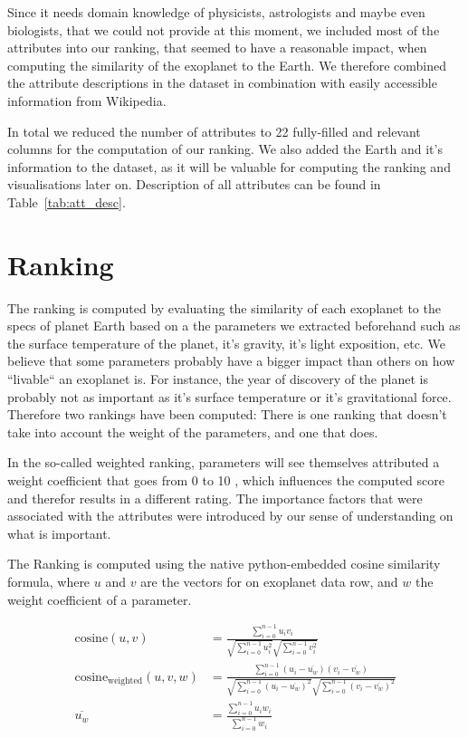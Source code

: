 \documentclass[12p]{article}
\begin{document}
Since it needs domain knowledge of physicists, astrologists and maybe even biologists, that we could not provide at this moment, we included most of the attributes into our ranking, that seemed to have a reasonable impact, when computing the similarity of the exoplanet to the Earth. We therefore combined the attribute descriptions in the dataset in combination with easily accessible information from Wikipedia.

In total we reduced the number of attributes to 22 fully-filled and relevant columns for the computation of our ranking. We also added the Earth and it's information to the dataset, as it will be valuable for computing the ranking and visualisations later on. Description of all attributes can be found in Table~\ref{tab:att_desc}.


\section{Ranking}
The ranking is computed by evaluating the similarity of each exoplanet to the specs of planet Earth based on a the parameters we extracted beforehand such as the surface temperature of the planet, it’s gravity, it’s light exposition, etc. We believe that some parameters probably have a bigger impact than others on how ``livable`` an exoplanet is. For instance, the year of discovery of the planet is probably not as important as it's surface temperature or it's gravitational force. Therefore two rankings have been computed: There is one ranking that doesn't take into account the weight of the parameters, and one that does.

In the so-called weighted ranking, parameters will see themselves attributed a weight coefficient that goes from 0 to 10 , which influences the computed score and therefor results in a different rating. The importance factors that were associated with the attributes were introduced by our sense of understanding on what is important.

The Ranking is computed using the native python-embedded cosine similarity formula, where $u$ and $v$ are the vectors for on exoplanet data row, and $w$ the weight coefficient of a parameter.

\begin{align}
\text{cosine}(u,v) &= \frac{\sum_{i=0}^{n-1} u_iv_i  }{ \sqrt{\sum_{i=0}^{n-1} u_i^2  } \sqrt{\sum_{i=0}^{n-1} v_i^2  }} \label{eq:cosine}\\
\text{cosine}_{\text{weighted}}(u,v,w) &= \frac{\sum_{i=0}^{n-1} (u_i-\overline{u_w})(v_i-\overline{v_w})  }{ \sqrt{\sum_{i=0}^{n-1} (u_i-\overline{u_w})^2  } \sqrt{\sum_{i=0}^{n-1} (v_i-\overline{v_w})^2  }} \label{eq:cosine_weighted} \\
\overline{u_w} &= \frac{ \sum_{i=0}^{n-1} u_iw_i }{ \sum_{i=0}^{n-1} w_i } \label{eq:weighted_mean}
\end{align}
\end{document}
